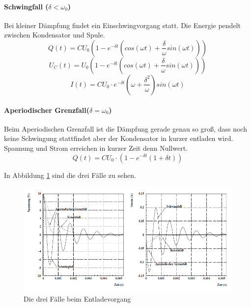 \documentclass[a4paper, 11pt]{article}
\begin{document}
\paragraph{Schwingfall ($\delta < \omega_0$)}
Bei kleiner Dämpfung findet ein Einschwingvorgang statt. Die Energie pendelt zwischen Kondensator und Spule.
\begin{equation}
Q(t) = CU_0 (1-e^{-\delta t} (cos(\omega t) + \frac{\delta}{\omega} sin(\omega t)))
\end{equation}
\begin{equation}
U_C(t) = U_0 (1-e^{-\delta t} (cos(\omega t) + \frac{\delta}{\omega} sin(\omega t)))
\end{equation}
\begin{equation}
I(t) = CU_0 \cdot e^{-\delta t} (\omega + \frac{\delta^2}{\omega}) sin(\omega t)
\end{equation}

\paragraph{Aperiodischer Grenzfall($\delta = \omega_0$)}
Beim Aperiodischen Grenzfall ist die Dämpfung gerade genau so groß, dass noch keine Schwingung stattfindet aber der Kondensator in kurzer entladen wird. Spannung und Strom erreichen in kurzer Zeit denn Nullwert.
\begin{equation}
Q(t) = CU_0 \cdot (1 - e^{-\delta t} (1 + \delta t))
\end{equation}



In Abbildung \ref{Die drei Fälle beim Entladevorgang} sind die drei Fälle zu sehen.
\begin{figure}[H]
\centering
\includegraphics[scale=0.6]{Grundlagen.png}
\caption{Die drei Fälle beim Entladevorgang}
\label{Die drei Fälle beim Entladevorgang}
\end{figure}
\end{document}
